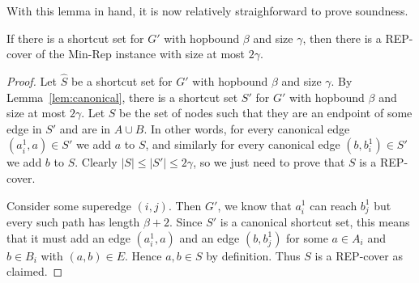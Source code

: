 With this lemma in hand, it is now relatively straighforward to prove soundness.

\begin{lemma} \label{lem:soundness}
    If there is a shortcut set for $G'$ with hopbound $\beta$ and size $\gamma$, then there is a REP-cover of the Min-Rep instance with size at most $2\gamma$.
\end{lemma}
\begin{proof}
    Let $\hat S$ be a shortcut set for $G'$ with hopbound $\beta$ and size $\gamma$.  By Lemma~\ref{lem:canonical}, there is a shortcut set $S'$ for $G'$ with hopbound $\beta$ and size at most $2\gamma$.  Let $S$ be the set of nodes such that they are an endpoint of some edge in $S'$ and are in $A \cup B$.  In other words, for every canonical edge $(a_i^1, a) \in S'$ we add $a$ to $S$, and similarly for every canonical edge $(b, b_i^1) \in S'$ we add $b$ to $S$.  Clearly $|S| \leq |S'| \leq 2\gamma$, so we just need to prove that $S$ is a REP-cover.

    Consider some superedge $(i,j)$.  Then $G'$, we know that $a_i^1$ can reach $b_j^1$ but every such path has length $\beta+2$.  Since $S'$ is a canonical shortcut set, this means that it must add an edge $(a_i^1, a)$ and an edge $(b, b_j^1)$ for some $a \in A_i$ and $b \in B_i$ with $(a,b) \in E$.  Hence $a,b \in S$ by definition.  Thus $S$ is a REP-cover as claimed.  
\end{proof}